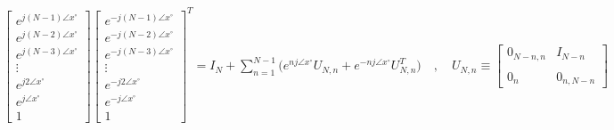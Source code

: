 \documentclass{article}
\begin{document}
\begin{align*}
    &\begin{bmatrix}
         e^{j(N - 1)\angle{x}^{\circ}} \\
         e^{j(N - 2)\angle{x}^{\circ}} \\
         e^{j(N - 3)\angle{x}^{\circ}} \\
         \vdots \\
         e^{j2\angle{x}^{\circ}} \\
         e^{j\angle{x}^{\circ}} \\
         1
       \end{bmatrix}
     \begin{bmatrix}
         e^{-j(N - 1)\angle{x}^{\circ}} \\
         e^{-j(N - 2)\angle{x}^{\circ}} \\
         e^{-j(N - 3)\angle{x}^{\circ}} \\
         \vdots \\
         e^{-j2\angle{x}^{\circ}} \\
         e^{-j\angle{x}^{\circ}} \\
         1
       \end{bmatrix}^{T} = I_{N} + \sum_{n=1}^{N - 1}\Bigg(e^{nj\angle{x}^{\circ}}U_{N, n} + e^{-nj\angle{x}^{\circ}}U_{N, n}^{T}\Bigg) \quad , \quad U_{N, n} \equiv \begin{bmatrix}
                                                                                                                                                                            0_{N - n, n} & I_{N - n} \\ \\
                                                                                                                                                                            0_{n} & 0_{n, N - n}
                                                                                                                                                                        \end{bmatrix}
\end{align*}
\end{document}
